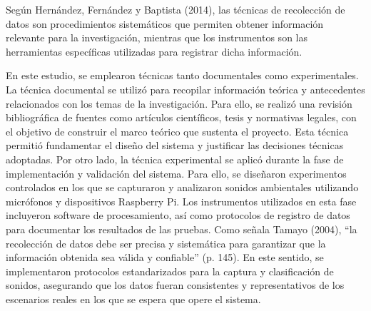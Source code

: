 
Según Hernández, Fernández y Baptista (2014), las técnicas de recolección de datos son procedimientos sistemáticos que permiten obtener información relevante para la investigación, mientras que los instrumentos son las herramientas específicas utilizadas para registrar dicha información.

En este estudio, se emplearon técnicas tanto documentales como experimentales. La técnica documental se utilizó para recopilar información teórica y antecedentes relacionados con los temas de la investigación. Para ello, se realizó una revisión bibliográfica de fuentes como artículos científicos, tesis y normativas legales, con el objetivo de construir el marco teórico que sustenta el proyecto. Esta técnica permitió fundamentar el diseño del sistema y justificar las decisiones técnicas adoptadas. Por otro lado, la técnica experimental se aplicó durante la fase de implementación y validación del sistema. Para ello, se diseñaron experimentos controlados en los que se capturaron y analizaron sonidos ambientales utilizando micrófonos y dispositivos Raspberry Pi. Los instrumentos utilizados en esta fase incluyeron software de procesamiento, así como protocolos de registro de datos para documentar los resultados de las pruebas. Como señala Tamayo (2004), ``la recolección de datos debe ser precisa y sistemática para garantizar que la información obtenida sea válida y confiable'' (p. 145). En este sentido, se implementaron protocolos estandarizados para la captura y clasificación de sonidos, asegurando que los datos fueran consistentes y representativos de los escenarios reales en los que se espera que opere el sistema.
